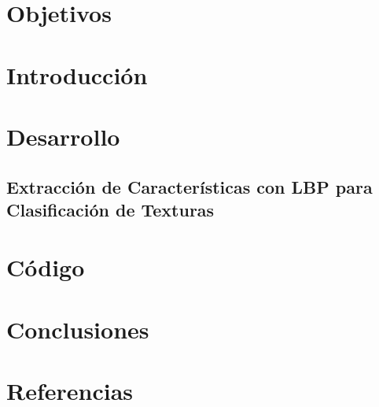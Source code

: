 \documentclass[12pt]{article}
\begin{document}


\section{Objetivos}



\section{Introducción}



\newpage

\section{Desarrollo}

\subsection{Extracción de Características con LBP para Clasificación de Texturas}



\section{Código}



\section{Conclusiones}



\newpage

\section{Referencias}


\end{document}
